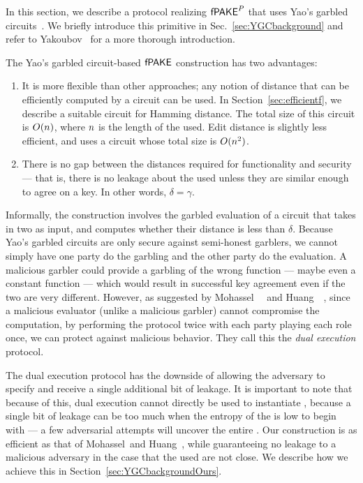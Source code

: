 In this section, we describe a protocol realizing $\textsf{fPAKE}^{P}$ that uses Yao's garbled circuits~\cite{FOCS:Yao86}.
We briefly introduce this primitive in Sec.~\ref{sec:YGCbackground} and refer to Yakoubov~\cite{YGCintro} for a more thorough introduction.

The Yao's garbled circuit-based $\textsf{fPAKE}$ construction has two advantages:
\begin{enumerate}
\item 
It is more flexible than other approaches; any notion of distance that can be efficiently computed by a circuit can be used.
In Section~\ref{sec:efficientf}, we describe a suitable circuit for Hamming distance.
The total size of this circuit is $O(n)$, where $n$ is the length of the \passwords used.
Edit distance is slightly less efficient, and uses a circuit whose total size is $O(n^2)$.
\item 
There is no gap between the distances required for functionality and security --- that is, there is no leakage about the \passwords used unless they are similar enough to agree on a key. 
In other words, $\delta = \gamma$.
\end{enumerate}

Informally, the construction involves the garbled evaluation of a circuit that takes in two \passwords as input, and computes whether their distance is less than $\delta$.
Because Yao's garbled circuits are only secure against semi-honest garblers, we cannot simply have one party do the garbling and the other party do the evaluation.
A malicious garbler could provide a garbling of the wrong function --- maybe even a constant function --- which would result in successful key agreement even if the two \passwords are very different.
However, as suggested by Mohassel~\etal~\cite{PKC:MohFra06b} and Huang~\etal~\cite{SP:HuaKatEva12}, since a malicious evaluator (unlike a malicious garbler) cannot compromise the computation, by performing the protocol twice with each party playing each role once, we can protect against malicious behavior.
They call this the \emph{dual execution} protocol.

The dual execution protocol has the downside of allowing the adversary to specify and receive a single additional bit of leakage. 
It is important to note that because of this, dual execution cannot directly be used to instantiate \fPAKE, because a single bit of leakage can be too much when the entropy of the \passwords is low to begin with --- a few adversarial attempts will uncover the entire \password.
Our construction is as efficient as that of Mohassel~\etal and Huang~\etal, while guaranteeing no leakage to a malicious adversary in the case that the \passwords used are not close.
We describe how we achieve this in Section~\ref{sec:YGCbackgroundOurs}. 

